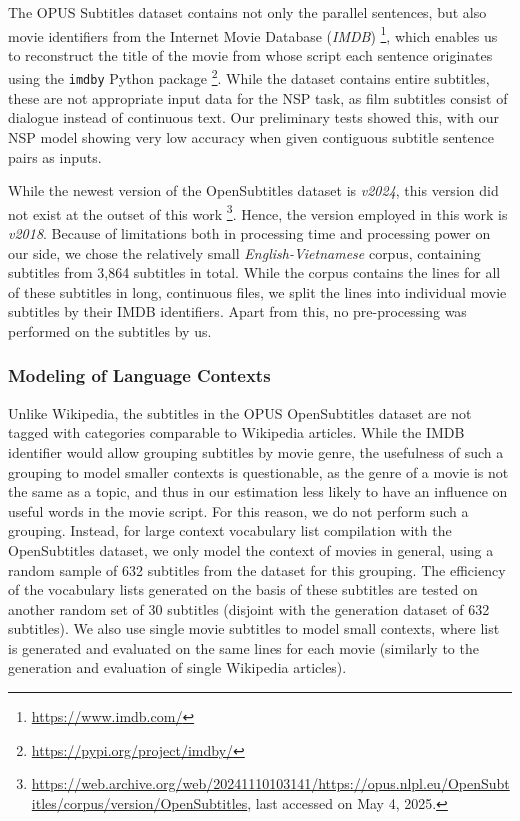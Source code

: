The OPUS Subtitles dataset contains not only the parallel sentences, but also movie identifiers from the Internet Movie Database (\textit{IMDB}) \footnote{\url{https://www.imdb.com/}}, which enables us to reconstruct the title of the movie from whose script each sentence originates using the \texttt{imdby} Python package \footnote{\url{https://pypi.org/project/imdby/}}.
While the dataset contains entire subtitles, these are not appropriate input data for the NSP task, as film subtitles consist of dialogue instead of continuous text.
Our preliminary tests showed this, with our NSP model showing very low accuracy when given contiguous subtitle sentence pairs as inputs.

While the newest version of the OpenSubtitles dataset is \textit{v2024}, this version did not exist at the outset of this work
\footnote{\url{https://web.archive.org/web/20241110103141/https://opus.nlpl.eu/OpenSubtitles/corpus/version/OpenSubtitles}, last accessed on May 4, 2025.}.
Hence, the version employed in this work is \textit{v2018}.
Because of limitations both in processing time and processing power on our side, we chose the relatively small \textit{English-Vietnamese} corpus, containing subtitles from 3,864 subtitles in total.
While the corpus contains the lines for all of these subtitles in long, continuous files, we split the lines into individual movie subtitles by their IMDB identifiers.
Apart from this, no pre-processing was performed on the subtitles by us.

\subsubsection{Modeling of Language Contexts}
Unlike Wikipedia, the subtitles in the OPUS OpenSubtitles dataset are not tagged with categories comparable to Wikipedia articles.
While the IMDB identifier would allow grouping subtitles by movie genre, the usefulness of such a grouping to model smaller contexts is questionable, as the genre of a movie is not the same as a topic, and thus in our estimation less likely to have an influence on useful words in the movie script.
For this reason, we do not perform such a grouping.
Instead, for large context vocabulary list compilation with the OpenSubtitles dataset, we only model the context of movies in general, using a random sample of 632 subtitles from the dataset for this grouping.
The efficiency of the vocabulary lists generated on the basis of these subtitles are tested on another random set of 30 subtitles (disjoint with the generation dataset of 632 subtitles).
We also use single movie subtitles to model small contexts, where list is generated and evaluated on the same lines for each movie (similarly to the generation and evaluation of single Wikipedia articles).


